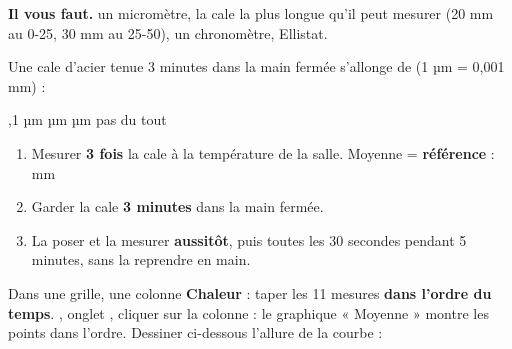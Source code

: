 \documentclass[11pt,a4paper]{article}
\begin{document}
\thispagestyle{fancy}
\vspace{-2pt}
\begin{tcolorbox}[boite,left=5pt,right=5pt,top=2pt,bottom=2pt]\small\textbf{Il vous faut.} un micromètre, la cale la plus longue qu'il peut mesurer (20 mm au 0-25, 30 mm au 25-50), un chronomètre, Ellistat.\end{tcolorbox}

Une cale d'acier tenue 3 minutes dans la main fermée s'allonge de (1 µm = 0,001 mm) :\par\smallskip{},1 µm \quad {} µm \quad {} µm \quad \cb pas du tout
\begin{enumerate}[label=\textbf{\alph*.},leftmargin=16pt,itemsep=1pt]
\item Mesurer \textbf{3 fois} la cale à la température de la salle. Moyenne = \textbf{référence} : \champ{25mm} mm
\item Garder la cale \textbf{3 minutes} dans la main fermée.
\item La poser et la mesurer \textbf{aussitôt}, puis toutes les 30 secondes pendant 5 minutes, sans la reprendre en main.
\end{enumerate}
\par{}\par
{}
Dans une grille, une colonne \textbf{Chaleur} : taper les 11 mesures \textbf{dans l'ordre du temps}. , onglet , cliquer sur la colonne : le graphique « Moyenne » montre les points dans l'ordre. Dessiner ci-dessous l'allure de la courbe :
\par\vspace{2pt}\fbox{\rule{0pt}{20mm}\rule{0.97\linewidth}{0pt}}
\end{document}
